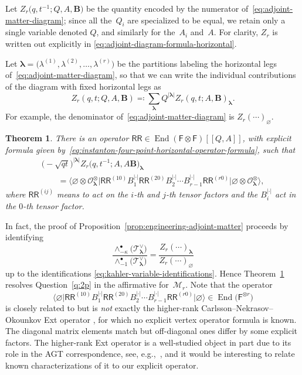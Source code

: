 \documentclass[pdftex]{sigma}%
\numberwithin{equation}{section}
\newtheorem{Theorem}{Theorem}[section]
\renewcommand{\vec}[1]{\bm{#1}}
\newcommand{\cM}{\mathcal{M}}
\newcommand{\cO}{\mathcal{O}}
\newcommand{\cT}{\mathcal{T}}
\newcommand{\sF}{\mathsf{F}}
\newcommand{\sRR}{\mathsf{RR}}
\DeclareMathOperator{\End}{End}
\begin{document}
\begin{MyParagraph}
Let $Z_r\big(q,t^{-1}; Q, A, \vec B\big)$ be the quantity encoded by the
numerator of~\eqref{eq:adjoint-matter-diagram}; since all the~$Q_i$
are specialized to be equal, we retain only a single variable denoted
$Q$, and similarly for the~$A_i$ and~$A$. For clarity, $Z_r$ is
written out explicitly in
\eqref{eq:adjoint-diagram-formula-horizontal}.

Let
$\vec\lambda = \big(\lambda^{(1)}, \lambda^{(2)}, \ldots, \lambda^{(r)}\big)$
be the partitions labeling the horizontal legs of~\eqref{eq:adjoint-matter-diagram}, so that we can write the individual
contributions of the diagram with fixed horizontal legs as
\[ Z_r(q,t;Q,A,\vec B) \eqqcolon \sum_{\vec\lambda} Q^{|\vec\lambda|} Z_r(q,t; A,\vec B)_{\vec\lambda}. \]
For example, the denominator of~\eqref{eq:adjoint-matter-diagram} is
$Z_r(\cdots)_{\vec\varnothing}$.

\begin{Theorem} \label{thm:instanton-RR-operator}
 There is an operator $\sRR \in \End(\sF \otimes \sF)[[Q, A]]$, with
 explicit formula given by~\eqref{eq:instanton-four-point-horizontal-operator-formula}, such that
 \begin{gather}
 \big({-}\sqrt{qt}\big)^{|\vec\lambda|} Z_r\big(q, t^{-1}; A, A\vec B\big)_{\vec\lambda} \nonumber\\
 \qquad{}= \big\langle \varnothing \otimes \cO^{\otimes}_{\vec\lambda} \big| \sRR^{(10)} B_1^{|\cdot|} \sRR^{(20)} B_2^{|\cdot|} \cdots B_{r-1}^{|\cdot|} \sRR^{(r0)} \big| \varnothing \otimes \cO^{\otimes}_{\vec\lambda}\big\rangle,\label{eq:instanton-RR-operator-matrix-elements}
 \end{gather}
 where $\sRR^{(ij)}$ means to act on the $i$-th and $j$-th tensor
 factors and the $B_i^{|\cdot|}$ act in the $0$-th tensor factor.
\end{Theorem}
\end{MyParagraph}

\begin{MyParagraph}
In fact, the proof of
Proposition~\ref{prop:engineering-adjoint-matter} proceeds by identifying
\[ \frac{\wedge^\bullet_{-\kappa} \big(\cT_{\vec\lambda}^\vee\big)}{\wedge^\bullet_{-1} \big(\cT_{\vec\lambda}^\vee\big)} = \frac{Z_r(\cdots)_{\vec\lambda}}{Z_r(\cdots)_{\vec\varnothing}} \]
up to the identifications \eqref{eq:kahler-variable-identifications}.
Hence Theorem~\ref{thm:instanton-RR-operator} resolves
Question~\ref{q:2p} in the affirmative for~$\cM_r$. Note that the
operator
\[ \big\langle \varnothing \big| \sRR^{(10)} B_1^{|\cdot|} \sRR^{(20)} B_2^{|\cdot|} \cdots B_{r-1}^{|\cdot|} \sRR^{(r0)} \big| \varnothing\big\rangle \in \End\big(\sF^{\otimes r}\big) \]
is closely related to but is {\it not} exactly the higher-rank
Carlsson--Nekrasov--Okounkov Ext operator \cite{Carlsson2014}, for
which no explicit vertex operator formula is known. The diagonal
matrix elements match but off-diagonal ones differ by some explicit
factors. The higher-rank Ext operator is a well-studied object in part
due to its role in the AGT correspondence, see, e.g.,~\cite{Negut2018},
and it would be interesting to relate known characterizations of it to
our explicit operator.
\end{MyParagraph}
\end{document}
